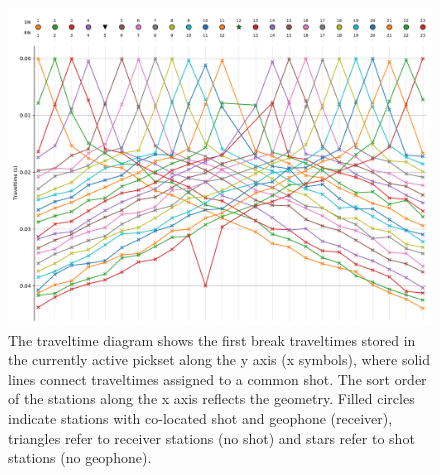 \documentclass[a4paper,fleqn]{cas-sc}
\begin{document}
\begin{figure}
	\centering
	\includegraphics[width=.75\textwidth]{figures/traveltimes_intro.pdf}
	\caption{The traveltime diagram shows the first break traveltimes stored in the currently active pickset along the y axis (x symbols), where solid lines connect traveltimes assigned to a common shot. The sort order of the stations along the x axis reflects the geometry. Filled circles indicate stations with co-located shot and geophone (receiver), triangles refer to receiver stations (no shot) and stars refer to shot stations (no geophone).}
	\label{fig:traveltimes_intro}
\end{figure}
\end{document}
